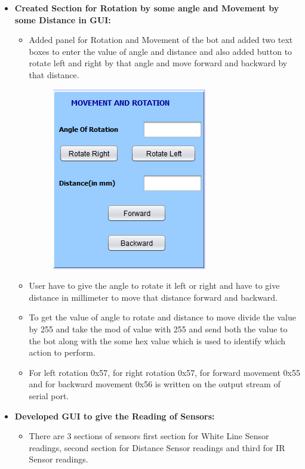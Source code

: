 \documentclass{article}
\begin{document}
\begin{enumerate}
\begin{itemize}
\begin{itemize}
			\end{itemize} 
			\item \textbf{Created Section for Rotation by some angle and Movement by some Distance in GUI:} \\
			\begin{itemize}
				\item Added panel for Rotation and Movement of the bot and added two text boxes to enter the value of angle and distance and also added button to rotate left and right by that angle and move forward and backward by that distance.
				\newpage
				\begin{figure}[h]
					\begin{center}
						\includegraphics[scale=1]{rotation_movement.png}
					\end{center}
				\end{figure} 
				\item User have to give the angle to rotate it left or right and have to give distance in millimeter to move that distance forward and backward.
				\item To get the value of angle to rotate and distance to move divide the value by 255 and take the mod of value with 255 and send both the value to the bot along with the some hex value which is used to identify which action to perform.
				\item For left rotation 0x57, for right rotation 0x57, for forward movement 0x55 and for backward movement 0x56 is written on the output stream of serial port.
			\end{itemize}   
			\item \textbf{Developed GUI to give the Reading of Sensors: } 
			\begin{itemize}
				\item There are 3 sections of sensors first section for White Line Sensor readings, second section for Distance Sensor readings and third for IR Sensor readings.

\end{itemize}
\end{itemize}
\end{enumerate}
\end{document}
